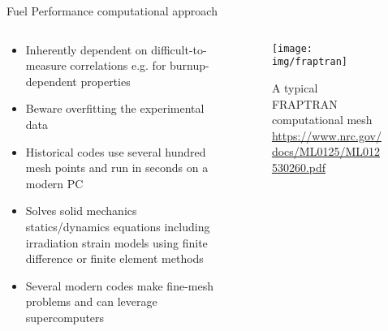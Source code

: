 \documentclass[pdf,aspectratio=169]{beamer}
\begin{document}
\begin{frame}{Fuel Performance computational approach}
    \begin{columns}
    \begin{column}{0.6\textwidth}
        \begin{itemize}
            \item Inherently dependent on difficult-to-measure correlations e.g. for burnup-dependent
                properties
            \item Beware overfitting the experimental data
            \item Historical codes use several hundred mesh points and run in seconds on
                a modern PC
            \item Solves solid mechanics statics/dynamics equations including irradiation
                strain models using finite difference or finite element methods
            \item Several modern codes make fine-mesh problems and can leverage supercomputers
        \end{itemize}
    \end{column}
    \begin{column}{0.4\textwidth}
        \begin{figure}[ht]
        \centering
            \texttt{[image: img/fraptran]}
            \caption{\tiny A typical FRAPTRAN computational mesh
            \url{https://www.nrc.gov/docs/ML0125/ML012530260.pdf}} 
        \end{figure}
    \end{column}
\end{columns}
\end{frame}
\end{document}
